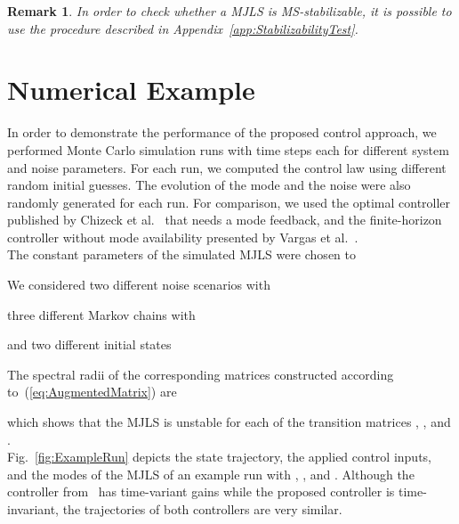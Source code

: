 \documentclass[preprint,1p,11pt]{IR-Template/ISAS_IR}
\newtheorem{remark}{Remark}
\begin{document}
\begin{remark}
In order to check whether a MJLS is MS-stabilizable, it is possible to use the procedure described in Appendix~\ref{app:StabilizabilityTest}.
\end{remark}



%
    	
   \section{Numerical Example}
   	\label{sec:NumericalExample}
   	In order to demonstrate the performance of the proposed control approach, we performed Monte Carlo simulation runs with  time steps each for different system and noise parameters. For each run, we computed the control law using different random initial guesses. The evolution of the mode and the noise were also randomly generated for each run. For comparison, we used the optimal controller published by Chizeck et al.~\cite{Chizeck_1986} that needs a mode feedback, and the finite-horizon controller without mode availability presented by Vargas et al.~\cite{Vargas_2013}.\\

The constant parameters of the simulated MJLS were chosen to


We considered two different noise scenarios with

three different Markov chains with

and two different initial states

The spectral radii of the corresponding matrices constructed according to~(\ref{eq:AugmentedMatrix}) are 

which shows that the MJLS is unstable for each of the transition matrices , , and .\\

Fig.~\ref{fig:ExampleRun} depicts the state trajectory, the applied control inputs, and the modes of the MJLS of an example run with , , and . Although the controller from~\cite{Vargas_2013} has time-variant gains while the proposed controller is time-invariant, the trajectories of both controllers are very similar.\\
\end{document}
